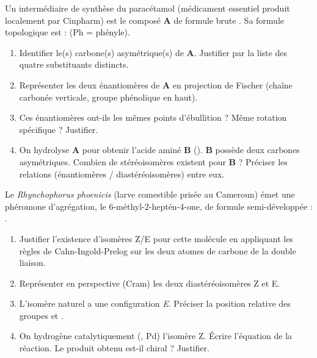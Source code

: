 \documentclass[11pt]{article}
\begin{document}
\begin{exercice}
Un intermédiaire de synthèse du paracétamol (médicament essentiel produit localement par Cinpharm) est le composé \textbf{A} de formule brute . Sa formule topologique est :  (Ph = phényle).
\begin{enumerate}
    \item Identifier le(s) carbone(s) asymétrique(s) de \textbf{A}. Justifier par la liste des quatre substituants distincts.
    \item Représenter les deux énantiomères de \textbf{A} en projection de Fischer (chaîne carbonée verticale, groupe  phénolique en haut).
    \item Ces énantiomères ont-ils les mêmes points d'ébullition ? Même rotation spécifique ? Justifier.
    \item On hydrolyse \textbf{A} pour obtenir l'acide aminé \textbf{B} (). \textbf{B} possède deux carbones asymétriques. Combien de stéréoisomères existent pour \textbf{B} ? Préciser les relations (énantiomères / diastéréoisomères) entre eux.
\end{enumerate}
\end{exercice}

\begin{exercice}
Le \textit{Rhynchophorus phoenicis} (larve comestible prisée au Cameroun) émet une phéromone d'agrégation, le 6-méthyl-2-heptén-4-one, de formule semi-développée : .
\begin{enumerate}
    \item Justifier l'existence d'isomères Z/E pour cette molécule en appliquant les règles de Cahn-Ingold-Prelog sur les deux atomes de carbone de la double liaison.
    \item Représenter en perspective (Cram) les deux diastéréoisomères Z et E.
    \item L'isomère naturel a une configuration \textit{E}. Préciser la position relative des groupes  et .
    \item On hydrogène catalytiquement (, Pd) l'isomère Z. Écrire l'équation de la réaction. Le produit obtenu est-il chiral ? Justifier.
\end{enumerate}
\end{exercice}
\end{document}
